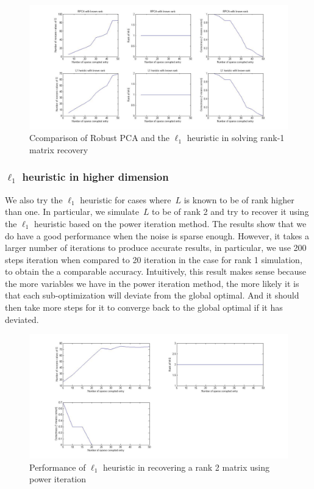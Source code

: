 \begin{figure}[h!]
\label{fig:comparison}
\centering
\includegraphics[width=\textwidth]{../figures/compare.jpg}
\caption{Ccomparison of Robust PCA and the $\ell_1$ heuristic in solving rank-1 matrix recovery}
\end{figure}

\subsubsection{$\ell_{1}$ heuristic in higher dimension}
We also try the $\ell_1$ heuristic for cases where~$L$ is known to be of rank higher than one. In particular, we simulate~$L$ to be of rank 2 and try to recover it using the $\ell_1$ heuristic based on the power iteration method. The results show that we do have a good performance when the noise is sparse enough. However, it takes a larger number of iterations to produce accurate results, in particular, we use 200 steps iteration when compared to 20 iteration in the case for rank 1 simulation, to obtain the a comparable accuracy. Intuitively, this result makes sense because the more variables we have in the power iteration method, the more likely it is that each sub-optimization will deviate from the global optimal. And it should then take more steps for it to converge back to the global optimal if it has deviated.
%
\begin{figure}[h!]
\centering
\includegraphics[width=\textwidth]{../figures/rank2case.jpg}
\caption{Performance of $\ell_1$ heuristic in recovering a rank 2 matrix using power iteration}
\label{fig:rank2}
\end{figure}

